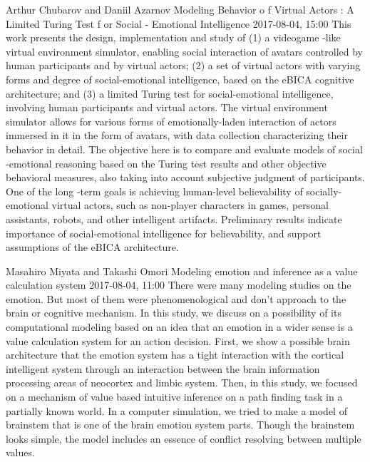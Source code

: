 \documentclass[10pt,fleqn,openany]{book} %
\begin{document}
\begin{enumerate}
		
		\paperabstract
		{Arthur Chubarov and Daniil Azarnov}
		{Modeling Behavior  o f Virtual Actors : A Limited Turing Test  f or Social - Emotional Intelligence}
		{2017-08-04, 15:00}
		{This  work  presents  the  design,  implementation  and study  of  (1)  a  videogame -like  virtual  environment simulator, enabling  social  interaction  of  avatars  controlled  by  human participants  and  by  virtual  actors;  (2)  a  set  of  virtual  actors with varying forms and degree of social-emotional intelligence,  based  on  the  eBICA  cognitive  architecture;  and  (3)  a  limited Turing  test  for  social-emotional  intelligence,  involving  human participants   and   virtual   actors.   The virtual   environment simulator   allows   for   various   forms   of   emotionally-laden interaction of actors immersed in it in the form of avatars,  with data  collection  characterizing  their  behavior  in  detail.  The  objective  here  is  to  compare  and  evaluate  models  of  social -emotional reasoning based on the Turing test results and other  objective   behavioral   measures,   also   taking   into   account  subjective judgment of participants. One of the long -term goals is   achieving   human-level   believability   of   socially-emotional  virtual   actors,   such   as   non-player   characters   in   games, personal   assistants,   robots,   and   other   intelligent   artifacts. Preliminary  results  indicate  importance  of  social-emotional intelligence  for  believability,  and  support  assumptions  of  the eBICA architecture.}
		
		
		\paperabstract
		{Masahiro Miyata and Takashi Omori}
		{Modeling emotion and inference as a value calculation system}
		{2017-08-04, 11:00}
		{There were many modeling studies on the emotion. But most of them were phenomenological and don't approach to the brain or cognitive mechanism. In this study, we discuss on a possibility of its computational modeling based on an idea that an emotion in a wider sense is a value calculation system for an action decision. First, we show a possible brain architecture that the emotion system has a tight interaction with the cortical intelligent system through an interaction between the brain information processing areas of neocortex and limbic system. Then, in this study, we focused on a mechanism of value based intuitive inference on a path finding task in a partially known world. In a computer simulation, we tried to make a model of brainstem that is one of the brain emotion system parts. Though the brainstem looks simple, the model includes an essence of conflict resolving between multiple values.}
		

\end{enumerate}
\end{document}
